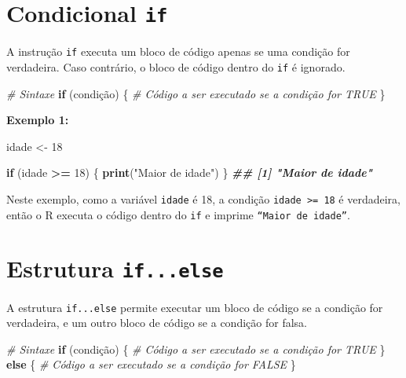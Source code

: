 \documentclass[
]{book}
\newenvironment{Shaded}{\begin{snugshade}}{\end{snugshade}}
\newcommand{\CommentTok}[1]{\textcolor[rgb]{0.56,0.35,0.01}{\textit{#1}}}
\newcommand{\ControlFlowTok}[1]{\textcolor[rgb]{0.13,0.29,0.53}{\textbf{#1}}}
\newcommand{\DecValTok}[1]{\textcolor[rgb]{0.00,0.00,0.81}{#1}}
\newcommand{\DocumentationTok}[1]{\textcolor[rgb]{0.56,0.35,0.01}{\textbf{\textit{#1}}}}
\newcommand{\FunctionTok}[1]{\textcolor[rgb]{0.13,0.29,0.53}{\textbf{#1}}}
\newcommand{\NormalTok}[1]{#1}
\newcommand{\OtherTok}[1]{\textcolor[rgb]{0.56,0.35,0.01}{#1}}
\newcommand{\SpecialCharTok}[1]{\textcolor[rgb]{0.81,0.36,0.00}{\textbf{#1}}}
\newcommand{\StringTok}[1]{\textcolor[rgb]{0.31,0.60,0.02}{#1}}
\begin{document}
\section{\texorpdfstring{Condicional \texttt{if}}{Condicional if}}\label{condicional-if}

A instrução \texttt{if} executa um bloco de código apenas se uma condição for
verdadeira. Caso contrário, o bloco de código dentro do \texttt{if} é ignorado.

\begin{Shaded}
\begin{Highlighting}[]
\CommentTok{\# Sintaxe   }
\ControlFlowTok{if}\NormalTok{ (condição) \{}
      \CommentTok{\# Código a ser executado se a condição for TRUE}
\NormalTok{\}}
\end{Highlighting}
\end{Shaded}

\textbf{Exemplo 1:}

\begin{Shaded}
\begin{Highlighting}[]
\NormalTok{idade }\OtherTok{\textless{}{-}} \DecValTok{18}

\ControlFlowTok{if}\NormalTok{ (idade }\SpecialCharTok{\textgreater{}=} \DecValTok{18}\NormalTok{) \{}
      \FunctionTok{print}\NormalTok{(}\StringTok{"Maior de idade"}\NormalTok{)}
\NormalTok{\}}
\DocumentationTok{\#\# [1] "Maior de idade"}
\end{Highlighting}
\end{Shaded}

Neste exemplo, como a variável \texttt{idade} é 18, a condição \texttt{idade\ \textgreater{}=\ 18} é
verdadeira, então o R executa o código dentro do \texttt{if} e imprime
\texttt{“Maior\ de\ idade”}.

\section{\texorpdfstring{Estrutura \texttt{if...else}}{Estrutura if...else}}\label{estrutura-if...else}

A estrutura \texttt{if...else} permite executar um bloco de código se a
condição for verdadeira, e um outro bloco de código se a condição for
falsa.

\begin{Shaded}
\begin{Highlighting}[]
\CommentTok{\# Sintaxe}
\ControlFlowTok{if}\NormalTok{ (condição) \{}
      \CommentTok{\# Código a ser executado se a condição for TRUE}
\NormalTok{\} }\ControlFlowTok{else}\NormalTok{ \{}
      \CommentTok{\# Código a ser executado se a condição for FALSE}
\NormalTok{\}}
\end{Highlighting}
\end{Shaded}
\end{document}
